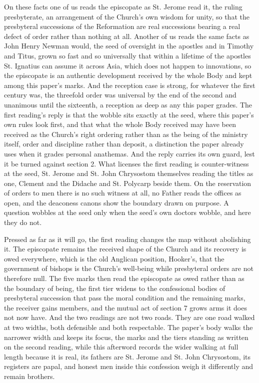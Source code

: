 On these facts one of us reads the episcopate as St. Jerome read it, the ruling presbyterate, an arrangement of the Church's own wisdom for unity, so that the presbyteral successions of the Reformation are real successions bearing a real defect of order rather than nothing at all. Another of us reads the same facts as John Henry Newman would, the seed of oversight in the apostles and in Timothy and Titus, grown so fast and so universally that within a lifetime of the apostles St. Ignatius can assume it across Asia, which does not happen to innovations, so the episcopate is an authentic development received by the whole Body and kept among this paper's marks. And the reception case is strong, for whatever the first century was, the threefold order was universal by the end of the second and unanimous until the sixteenth, a reception as deep as any this paper grades. The first reading's reply is that the wobble sits exactly at the seed, where this paper's own rules look first, and that what the whole Body received may have been received as the Church's right ordering rather than as the being of the ministry itself, order and discipline rather than deposit, a distinction the paper already uses when it grades personal anathemas. And the reply carries its own guard, lest it be turned against section 2. What licenses the first reading is counter-witness at the seed, St. Jerome and St. John Chrysostom themselves reading the titles as one, Clement and the Didache and St. Polycarp beside them. On the reservation of orders to men there is no such witness at all, no Father reads the offices as open, and the deaconess canons show the boundary drawn on purpose. A question wobbles at the seed only when the seed's own doctors wobble, and here they do not.

Pressed as far as it will go, the first reading changes the map without abolishing it. The episcopate remains the received shape of the Church and its recovery is owed everywhere, which is the old Anglican position, Hooker's, that the government of bishops is the Church's well-being while presbyteral orders are not therefore null. The five marks then read the episcopate as owed rather than as the boundary of being, the first tier widens to the confessional bodies of presbyteral succession that pass the moral condition and the remaining marks, the receiver gains members, and the mutual act of section 7 grows arms it does not now have. And the two readings are not two roads. They are one road walked at two widths, both defensible and both respectable. The paper's body walks the narrower width and keeps its focus, the marks and the tiers standing as written on the second reading, while this afterword records the wider walking at full length because it is real, its fathers are St. Jerome and St. John Chrysostom, its registers are papal, and honest men inside this confession weigh it differently and remain brothers.

